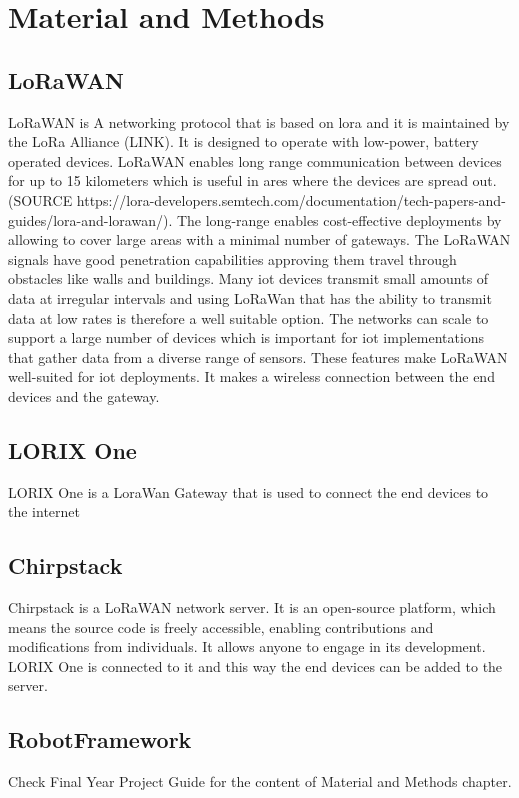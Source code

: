 
\chapter{Material and Methods} \label{ch:mat_met}
\section{LoRaWAN}
LoRaWAN is A networking protocol that is based on \gls{lora} and it is maintained by the LoRa Alliance (LINK). It is designed to operate with low-power, battery operated devices. LoRaWAN enables long range communication between devices for up to 15 kilometers which is useful in ares where the devices are spread out. (SOURCE https://lora-developers.semtech.com/documentation/tech-papers-and-guides/lora-and-lorawan/). The long-range enables cost-effective deployments by allowing to cover large areas with a minimal number of gateways. The LoRaWAN signals have good penetration capabilities approving them travel through obstacles like walls and buildings. Many \gls{iot} devices transmit small amounts of data at irregular intervals and using LoRaWan that has the ability to transmit data at low rates is therefore a well suitable option. The networks can scale to support a large number of devices which is important for \gls{iot} implementations that gather data from a diverse range of sensors. These features make LoRaWAN well-suited for \gls{iot} deployments. It makes a wireless connection between the end devices and the gateway.
\section{LORIX One}
LORIX One is a LoraWan Gateway that is used to connect the end devices to the internet
\section{Chirpstack}
    Chirpstack is a LoRaWAN network server. It is an open-source platform, which means the source code is freely accessible, enabling contributions and modifications from individuals. It allows anyone to engage in its development. LORIX One is connected to it and this way the end devices can be added to the server.
\section{RobotFramework}



Check Final Year Project Guide for the content of Material and Methods chapter.

\clearpage %

